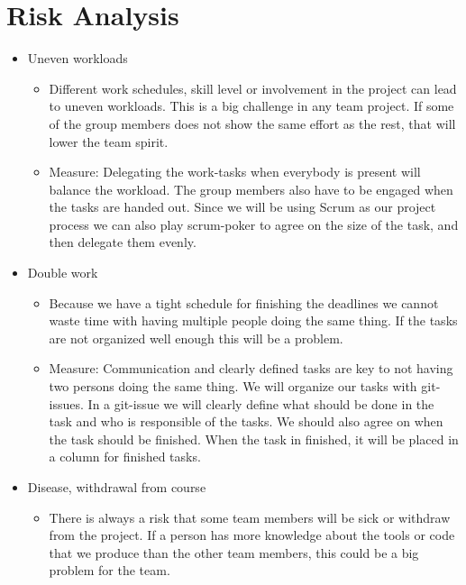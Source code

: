 \documentclass{article}
\begin{document}
\section*{Risk Analysis}
\begin{itemize}
\item Uneven workloads
    \begin{itemize}
    \item Different work schedules, skill level or involvement in the project can lead to uneven workloads. This is a big challenge in any team project. If some of the group members does not show the same effort as the rest, that will lower the team spirit. 
    \end{itemize}
    \begin{itemize}
    \item Measure:
    Delegating the work-tasks when everybody is present will balance the workload. The group members also have to be engaged when the tasks are handed out. Since we will be using Scrum as our project process we can also play scrum-poker to agree on the size of the task, and then delegate them evenly. 
    \end{itemize}
\item Double work
    \begin{itemize}
    \item Because we have a tight schedule for finishing the deadlines we cannot waste time with having multiple people doing the same thing. If the tasks are not organized well enough this will be a problem. 
    \end{itemize}
    \begin{itemize}
    \item Measure:
    Communication and clearly defined tasks are key to not having two persons doing the same thing. We will organize our tasks with git-issues. In a git-issue we will clearly define what should be done in the task and who is responsible of the tasks. We should also agree on when the task should be finished. When the task in finished, it will be placed in a column for finished tasks. 
    \end{itemize}
\item Disease, withdrawal from course
    \begin{itemize}
    \item There is always a risk that some team members will be sick or withdraw from the project. If a person has more knowledge about the tools or code that we produce than the other team members, this could be a big problem for the team.

\end{itemize}
\end{itemize}
\end{document}
